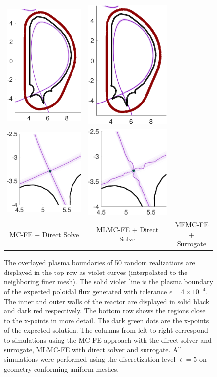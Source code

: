 \documentclass[final,3p,times,11pt]{elsarticle}
\begin{document}
\begin{figure}[ht!]\centering
\begin{tabular}{ccc}
\includegraphics[width=0.19\linewidth]{QoI_MC_uniform.pdf}
&\includegraphics[width=0.19\linewidth]{QoI_MLMC_uniform_L2norm.pdf} 
\\
\includegraphics[width=0.19\linewidth]{QoI_MC_uniform_xptRegion.pdf} 
&\includegraphics[width=0.19\linewidth]{QoI_MLMC_uniform_xptRegion_L2norm.pdf} 
\\[1ex]
\quad MC-FE + Direct Solve &MLMC-FE + Direct Solve &MFMC-FE + Surrogate  \\[-0.5ex]
\end{tabular}
\caption{The overlayed plasma boundaries of 50 random realizations are 
displayed in the top row as violet curves (interpolated to the neighboring 
finer mesh). The solid violet line is the plasma boundary of the expected 
poloidal flux generated with tolerance $\epsilon=4\times 10^{-4}$. 
The inner and outer walls of the reactor are displayed in solid black and 
dark red respectively. The bottom row shows the regions close to the 
x-points in more detail. The dark green dots are the x-points of the expected 
solution. The columns from left to right correspond to simulations using the 
MC-FE approach with the direct solver and surrogate, MLMC-FE with direct 
solver and surrogate. All simulations were performed using the discretization 
level $\ell=5$ on geometry-conforming uniform meshes.} 
\label{fig:QoI_plot}
\end{figure}
\end{document}
